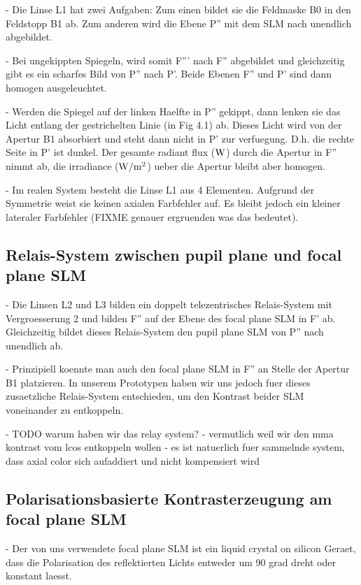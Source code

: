   - Die Linse L1 hat zwei Aufgaben: Zum einen bildet sie die Feldmaske   %
    B0 in den Feldstopp B1 ab. Zum anderen wird die Ebene P'' mit dem
    SLM nach unendlich abgebildet.

  - Bei ungekippten Spiegeln, wird somit F''' nach F'' abgebildet und    %
    gleichzeitig gibt es ein scharfes Bild von P'' nach P'. Beide
    Ebenen F'' und P' sind dann homogen ausgeleuchtet.

  - Werden die Spiegel auf der linken Haelfte in P'' gekippt, dann
    lenken sie das Licht entlang der gestrichelten Linie (in Fig 4.1)
    ab. Dieses Licht wird von der Apertur B1 absorbiert und steht dann
    nicht in P' zur verfuegung. D.h. die rechte Seite in P' ist
    dunkel. Der gesamte radiant flux ($\unit[]{W}$) durch die Apertur in
    F'' nimmt ab, die irradiance ($\unit[]{W/m^2}$) ueber die Apertur
    bleibt aber homogen.

  - Im realen System besteht die Linse L1 aus 4 Elementen. Aufgrund
    der Symmetrie weist sie keinen axialen Farbfehler auf. Es bleibt
    jedoch ein kleiner lateraler Farbfehler (FIXME genauer ergruenden
    was das bedeutet).
 

\subsection{ Relais-System zwischen pupil plane und focal plane SLM}
  - Die Linsen L2 und L3 bilden ein doppelt telezentrisches             %
    Relais-System mit Vergroesserung 2 und bilden F'' auf der Ebene
    des focal plane SLM in F' ab. Gleichzeitig bildet dieses
    Relais-System den pupil plane SLM von P'' nach unendlich ab.
 
  - Prinzipiell koennte man auch den focal plane SLM in F'' an Stelle
    der Apertur B1 platzieren. In unserem Prototypen haben wir uns
    jedoch fuer dieses zusaetzliche Relais-System entschieden, um den
    Kontrast beider SLM voneinander zu entkoppeln.

   - TODO warum haben wir das relay system? 
     - vermutlich weil wir den mma kontrast vom lcos entkoppeln wollen
     - es ist natuerlich fuer sammelnde system, dass axial color sich
       aufaddiert und nicht kompensiert wird


\subsection{ Polarisationsbasierte Kontrasterzeugung am focal plane SLM}
  - Der von uns verwendete focal plane SLM ist ein liquid crystal on
    silicon Geraet, dass die Polarisation des reflektierten Lichts
    entweder um 90 grad dreht oder konstant laesst.
 
